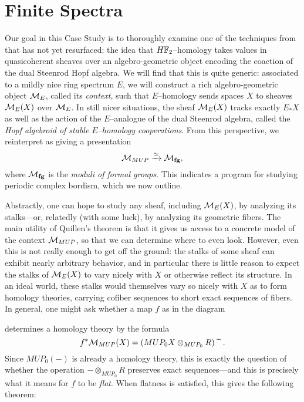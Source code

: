 
\chapter{Finite Spectra}\label{ChapterFiniteSpectra}



Our goal in this Case Study is to thoroughly examine one of the techniques from  that has not yet resurfaced: the idea that \(\HFtwo\)--homology takes values in quasicoherent sheaves over an algebro-geometric object encoding the coaction of the dual Steenrod Hopf algebra.  We will find that this is quite generic: associated to a mildly nice ring spectrum \(E\), we will construct a rich algebro-geometric object \(\mathcal{M}_{E}\), called its \textit{context}, such that \(E\)--homology sends spaces \(X\) to sheaves \(\mathcal{M}_{E}(X)\) over \(\mathcal{M}_{E}\).  In still nicer situations, the sheaf \(\mathcal{M}_{E}(X)\) tracks exactly \(E_* X\) as well as the action of the \(E\)--analogue of the dual Steenrod algebra, called the \textit{Hopf algebroid of stable \(E\)--homology cooperations}.  From this perspective, we reinterpret  as giving a presentation \[\mathcal{M}_{MUP} \xrightarrow{\simeq} \mathcal{M}_{\mathbf{fg}},\] where \(\mathcal{M}_{\mathbf{fg}}\) is the \textit{moduli of formal groups}.  This indicates a program for studying periodic complex bordism, which we now outline.

Abstractly, one can hope to study any sheaf, including \(\mathcal{M}_{E}(X)\), by analyzing its stalks---or, relatedly (with some luck), by analyzing its geometric fibers.  The main utility of Quillen's theorem is that it gives us access to a concrete model of the context \(\mathcal{M}_{MUP}\), so that we can determine where to even look.  However, even this is not really enough to get off the ground: the stalks of some sheaf can exhibit nearly arbitrary behavior, and in particular there is little reason to expect the stalks of \(\mathcal{M}_{E}(X)\) to vary nicely with \(X\) or otherwise reflect its structure.  In an ideal world, these stalks would themselves vary so nicely with \(X\) as to form homology theories, carrying cofiber sequences to short exact sequences of fibers.  In general, one might ask whether a map \(f\) as in the diagram
\begin{center}
\end{center}
determines a homology theory by the formula \[f^* \mathcal{M}_{MUP}(X) = (MUP_0 X \otimes_{MUP_0} R)\widetilde{\quad}.\]  Since \(MUP_0(-)\) is already a homology theory, this is exactly the question of whether the operation \(- \otimes_{MUP_0} R\) preserves exact sequences---and this is precisely what it means for \(f\) to be \textit{flat}.  When flatness is satisfied, this gives the following theorem:

